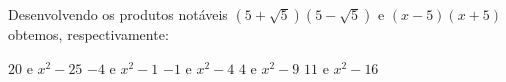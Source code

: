 Desenvolvendo os produtos notáveis $(5+\sqrt{5})(5-\sqrt{5})$ e $(x-5)(x+5)$ obtemos, respectivamente:

$20$ e $x^2-25$
$-4$ e $x^2-1$
$-1$ e $x^2-4$
$4$ e $x^2-9$
$11$ e $x^2-16$



